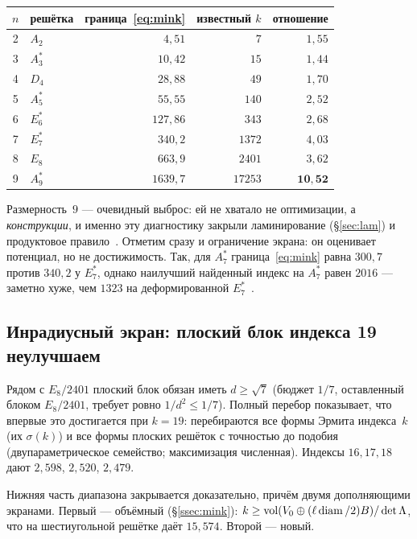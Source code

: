 \begin{center}\small
\begin{tabular}{c l r r r}
\toprule
$n$ & решётка & граница~\eqref{eq:mink} & известный $k$ & отношение\\
\midrule
2 & $A_2$    & $4{,}51$   & $7$     & $1{,}55$\\
3 & $A_3^*$  & $10{,}42$  & $15$    & $1{,}44$\\
4 & $D_4$    & $28{,}88$  & $49$    & $1{,}70$\\
5 & $A_5^*$  & $55{,}55$  & $140$   & $2{,}52$\\
6 & $E_6^*$  & $127{,}86$ & $343$   & $2{,}68$\\
7 & $E_7^*$  & $340{,}2$  & $1372$  & $4{,}03$\\
8 & $E_8$    & $663{,}9$  & $2401$  & $3{,}62$\\
9 & $A_9^*$  & $1639{,}7$ & $17253$ & $\mathbf{10{,}52}$\\
\bottomrule
\end{tabular}
\end{center}

\noindent Размерность~$9$ --- очевидный выброс: ей не хватало не оптимизации,
а \emph{конструкции}, и именно эту диагностику закрыли ламинирование
(\S\ref{sec:lam}) и продуктовое правило~\cite{Bounds}. Отметим сразу и
ограничение экрана: он оценивает потенциал, но не достижимость. Так, для
$A_7^*$ граница~\eqref{eq:mink} равна $300{,}7$ против $340{,}2$ у $E_7^*$,
однако наилучший найденный индекс на $A_7^*$ равен $2016$ --- заметно хуже, чем
$1323$ на деформированной $E_7^*$~\cite{Repo}.

\subsection{Инрадиусный экран: плоский блок индекса 19 неулучшаем}
\label{ssec:planefloor}

Рядом с $E_8/2401$ плоский блок обязан иметь $d\ge\sqrt7$ (бюджет $1/7$,
оставленный блоком $E_8/2401$, требует ровно $1/d^2\le1/7$). Полный перебор
показывает, что впервые это достигается при $k=19$: перебираются все формы
Эрмита индекса~$k$ (их $\sigma(k)$) и все формы плоских решёток с точностью до
подобия (двупараметрическое семейство; максимизация численная). Индексы
$16,17,18$ дают $2{,}598$, $2{,}520$, $2{,}479$.

Нижняя часть диапазона закрывается доказательно, причём двумя дополняющими
экранами. Первый --- объёмный (\S\ref{ssec:mink}): $k\ge\operatorname{vol}(V_0\oplus
(\ell\operatorname{diam}/2)B)/\det\Lambda$, что на шестиугольной решётке даёт $15{,}574$.
Второй --- новый.

